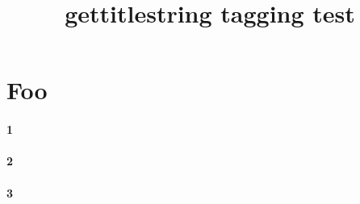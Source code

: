 \documentclass{article}
\title{gettitlestring tagging test}
\begin{document}
\def\foo{Foo}
\section{\foo}
\label{lab}

\paragraph{1}

\def\foo{Bar}
\paragraph{2}

\paragraph{3}
\end{document}
